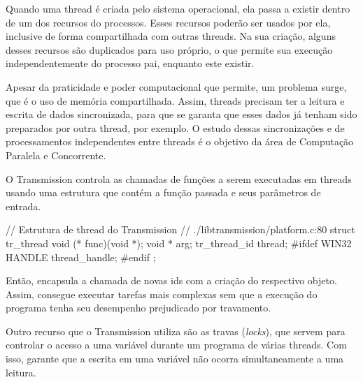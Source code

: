 Quando uma \gls*{thread} é criada pelo sistema operacional, ela passa a existir dentro
de um dos recursos do processos. Esses recursos poderão ser usados por ela, inclusive
de forma compartilhada com outras \glspl*{thread}. Na sua criação, alguns desses
recursos são duplicados para uso próprio, o que permite sua execução independentemente
do processo pai, enquanto este existir.

Apesar da praticidade e poder computacional que permite, um problema surge, que é o uso
de memória compartilhada. Assim, \glspl*{thread} precisam ter a leitura e escrita de
dados sincronizada, para que se garanta que esses dados já tenham sido preparados por
outra \gls*{thread}, por exemplo. O estudo dessas sincronizações e de processamentos
independentes entre \glspl*{thread} é o objetivo da área de Computação Paralela e
Concorrente.

O Transmission controla as chamadas de funções a serem executadas em \glspl*{thread}
usando uma estrutura que contém a função passada e seus parâmetros de entrada.

\begin{ccode}
// Estrutura de thread do Transmission
// ./libtransmission/platform.c:80
struct tr_thread {
    void            (* func)(void *);
    void             * arg;
    tr_thread_id       thread;
#ifdef WIN32
    HANDLE             thread_handle;
#endif
};
\end{ccode}

Então, encapsula a chamada de novas \glspl*{id} com a criação do respectivo objeto.
Assim, consegue executar tarefas mais complexas sem que a execução do programa tenha seu
desempenho prejudicado por travamento.


Outro recurso que o Transmission utiliza são as travas (\emph{locks}), que servem para
controlar o acesso a uma variável durante um programa de várias \glspl*{thread}. Com
isso, garante que a escrita em uma variável não ocorra simultaneamente a uma leitura.

